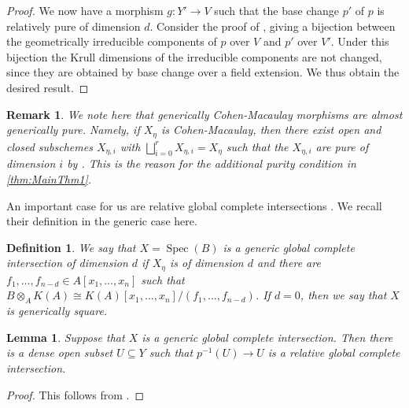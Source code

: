 \documentclass[12pt,reqno,a4paper]{amsart}
\theoremstyle{theoremstyle}
\newtheorem{lemma}[theorem]{Lemma}
\theoremstyle{examplestyle}
\newtheorem{definition}[theorem]{Definition}
\newtheorem{remark}[theorem]{Remark}
\theoremstyle{algorithmstyle}
\DeclareMathOperator{\Spec}{Spec}
\begin{document}
\begin{proof}
  We now have a morphism $g\colon Y'\to V$ such that the base change $p'$ of $p$ is relatively pure of dimension $d$. Consider the proof of \cite[\href{https://stacks.math.columbia.edu/tag/0556}{Lemma 0556}]{stacks-project}, giving a bijection between the geometrically irreducible components of $p$ over $V$ and $p'$ over $V'$. Under this bijection the Krull dimensions of the irreducible components are not changed, since they are obtained by base change over a field extension. We thus obtain the desired result.
\end{proof}

\begin{remark}
    We note here that generically Cohen-Macaulay morphisms are almost generically pure. %
Namely, if $X_{\eta}$ is %
Cohen-Macaulay, then there exist open and closed subschemes $X_{\eta,i}$ with $\bigsqcup_{i=0}^{r} X_{\eta,i}=X_{\eta}$ such that the $X_{\eta,i}$ are pure of dimension $i$ by \cite[\href{https://stacks.math.columbia.edu/tag/02NM}{Lemma 02NM}]{stacks-project}. %
This is the reason for the additional purity condition in \cref{thm:MainThm1}.   %
%
\end{remark}


An important case for us are relative global complete intersections \cite[\href{https://stacks.math.columbia.edu/tag/00SP}{Definition 00SP}]{stacks-project}. We recall their definition in the generic case here. %
%

%

\begin{definition}
We say that $X=\Spec(B)$ is a \emph{generic global complete intersection} of dimension $d$ if $X_{\eta}$ is of dimension $d$ and there are $f_1,\dots,f_{n-d}\in A[x_{1}, \dots, x_{n}]$ such that $B\otimes_{A}K(A)\cong K(A)[x_{1},\dots ,x_{n}]/(f_{1},\dots ,f_{n-d})$. If $d=0$, then we say that $X$ is \emph{generically square}.

\end{definition}

\begin{lemma}\label{lem:GlobalCompleteIntersection}
Suppose that $X$ is a generic global complete intersection. Then there is a dense open subset $U\subseteq Y$ such that $p^{-1}(U)\to U$ is a relative global complete intersection.
\end{lemma}
\begin{proof}
    This follows from \cite[\href{https://stacks.math.columbia.edu/tag/00ST}{Lemma 00ST(2)}]{stacks-project}.
\end{proof}
\end{document}
